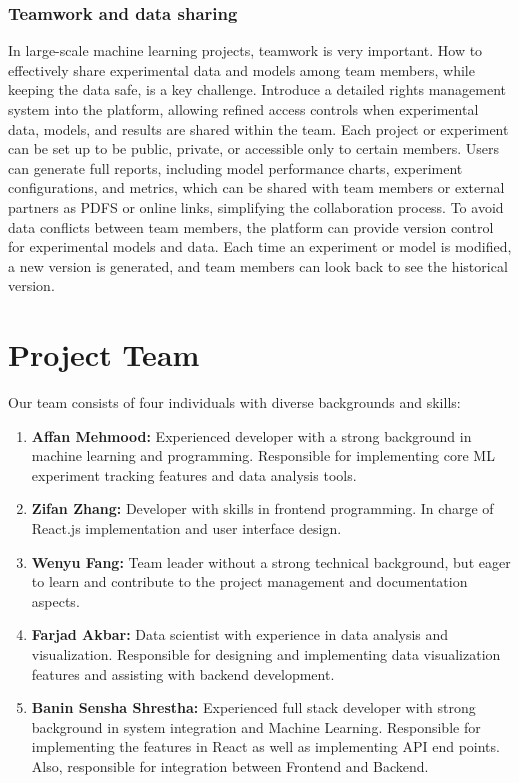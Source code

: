 \documentclass[12pt]{article}
\begin{document}
\subsubsection{Teamwork and data sharing}
In large-scale machine learning projects, teamwork is very important. How to effectively share experimental data and models among team members, while keeping the data safe, is a key challenge. Introduce a detailed rights management system into the platform, allowing refined access controls when experimental data, models, and results are shared within the team. Each project or experiment can be set up to be public, private, or accessible only to certain members. Users can generate full reports, including model performance charts, experiment configurations, and metrics, which can be shared with team members or external partners as PDFS or online links, simplifying the collaboration process. To avoid data conflicts between team members, the platform can provide version control for experimental models and data. Each time an experiment or model is modified, a new version is generated, and team members can look back to see the historical version.

\section{Project Team}

Our team consists of four individuals with diverse backgrounds and skills:

\begin{enumerate}
    \item \textbf{Affan Mehmood:} Experienced developer with a strong background in machine learning and programming. Responsible for implementing core ML experiment tracking features and data analysis tools.
    
    \item \textbf{Zifan Zhang:} Developer with skills in frontend programming. In charge of React.js implementation and user interface design.
    
    \item \textbf{Wenyu Fang:} Team leader without a strong technical background, but eager to learn and contribute to the project management and documentation aspects.
    
    \item \textbf{Farjad Akbar:} Data scientist with experience in data analysis and visualization. Responsible for designing and implementing data visualization features and assisting with backend development.

    \item \textbf{Banin Sensha Shrestha:} Experienced full stack developer with strong background in system integration and Machine Learning. Responsible for implementing the features in React as well as implementing API end points. Also, responsible for integration between Frontend and Backend.
\end{enumerate}
\end{document}
